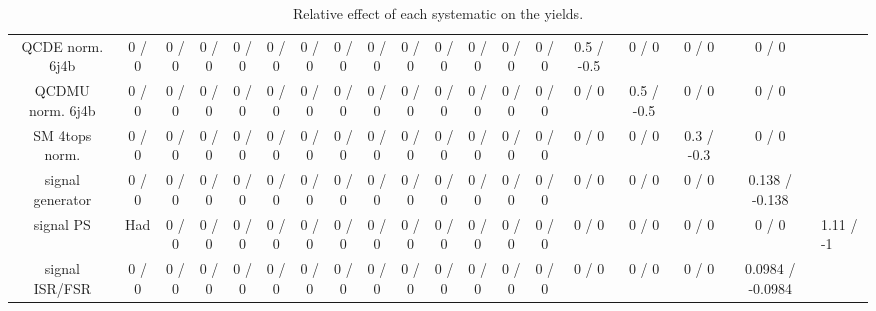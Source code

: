 \documentclass[10pt]{article}
\begin{document}
\begin{table}[htbp]
\begin{center}
\begin{tabular}{|c|c|c|c|c|c|c|c|c|c|c|c|c|c|c|c|c|c|}
  QCDE norm. 6j4b & 0 / 0 & 0 / 0 & 0 / 0 & 0 / 0 & 0 / 0 & 0 / 0 & 0 / 0 & 0 / 0 & 0 / 0 & 0 / 0 & 0 / 0 & 0 / 0 & 0 / 0 & 0.5 / -0.5 & 0 / 0 & 0 / 0 & 0 / 0 \\ 
  QCDMU norm. 6j4b & 0 / 0 & 0 / 0 & 0 / 0 & 0 / 0 & 0 / 0 & 0 / 0 & 0 / 0 & 0 / 0 & 0 / 0 & 0 / 0 & 0 / 0 & 0 / 0 & 0 / 0 & 0 / 0 & 0.5 / -0.5 & 0 / 0 & 0 / 0 \\ 
  SM 4tops norm. & 0 / 0 & 0 / 0 & 0 / 0 & 0 / 0 & 0 / 0 & 0 / 0 & 0 / 0 & 0 / 0 & 0 / 0 & 0 / 0 & 0 / 0 & 0 / 0 & 0 / 0 & 0 / 0 & 0 / 0 & 0.3 / -0.3 & 0 / 0 \\ 
  signal generator & 0 / 0 & 0 / 0 & 0 / 0 & 0 / 0 & 0 / 0 & 0 / 0 & 0 / 0 & 0 / 0 & 0 / 0 & 0 / 0 & 0 / 0 & 0 / 0 & 0 / 0 & 0 / 0 & 0 / 0 & 0 / 0 & 0.138 / -0.138 \\ 
  signal PS & Had & 0 / 0 & 0 / 0 & 0 / 0 & 0 / 0 & 0 / 0 & 0 / 0 & 0 / 0 & 0 / 0 & 0 / 0 & 0 / 0 & 0 / 0 & 0 / 0 & 0 / 0 & 0 / 0 & 0 / 0 & 0 / 0 & 1.11 / -1 \\ 
  signal ISR/FSR & 0 / 0 & 0 / 0 & 0 / 0 & 0 / 0 & 0 / 0 & 0 / 0 & 0 / 0 & 0 / 0 & 0 / 0 & 0 / 0 & 0 / 0 & 0 / 0 & 0 / 0 & 0 / 0 & 0 / 0 & 0 / 0 & 0.0984 / -0.0984 \\ 
\hline 
\end{tabular} 
\caption{Relative effect of each systematic on the yields.} 
\end{center} 
\end{table} 
\end{document}

